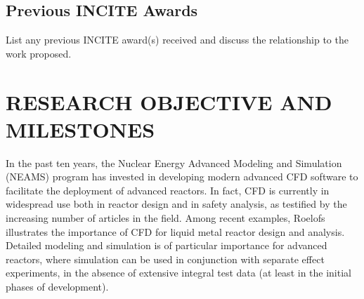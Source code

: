 
\vspace{-.25in}
\subsection{Previous INCITE Awards}
\vspace{-.2in}


List any previous INCITE award(s) received and discuss the relationship to the
work proposed. 

\vspace{-.25in}
\section{RESEARCH OBJECTIVE AND MILESTONES} %
\vspace{-.2in}


In the past ten years, the Nuclear Energy Advanced Modeling and Simulation
(NEAMS) program \cite{sofu2017us} has invested in developing modern advanced
CFD software to facilitate the deployment of advanced reactors. In fact, CFD is
currently in widespread use both in reactor design and in safety analysis, as
testified by the increasing number of articles in the field. Among recent
examples, Roelofs \cite{roelofs2018thermal} illustrates the importance of CFD
for liquid metal reactor design and analysis. Detailed modeling and simulation
is of particular importance for advanced reactors, where simulation can be used
in conjunction with separate effect experiments, in the absence of extensive
integral test data (at least in the initial phases of development).

